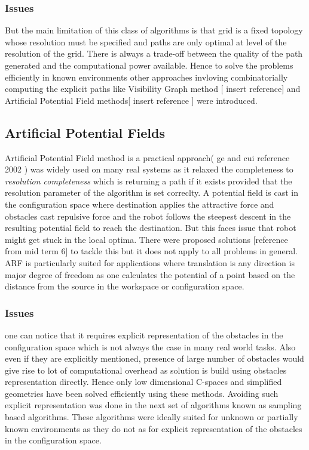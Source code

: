 \documentclass[MTech]{iitmdiss}
\begin{document}
\subsubsection{Issues}
 But the main limitation of this class of algorithms is that grid is a fixed topology whose resolution must be specified and paths are only optimal at level of  the resolution of the grid. There is always a trade-off between the quality of the path generated and the computational power available. Hence to solve the problems efficiently in known environments other approaches invloving combinatorially computing the explicit paths like Visibility Graph method [ insert reference]  and Artificial Potential Field methods[ insert reference ] were introduced. 
\subsection{Artificial Potential Fields}
Artificial Potential Field method is a practical approach( ge and cui reference 2002 ) was widely used on many real systems as it relaxed the completeness to \emph{resolution completeness} which is returning a path if it exists provided that the resolution parameter of the algorithm is set correclty. A potential field is cast in the configuration space where destination applies the attractive force and obstacles cast repulsive force and the robot follows the steepest descent in the resulting potential field to reach the destination. But this faces issue that robot might get stuck in the local optima. There were proposed solutions [reference from mid term 6] to tackle this but it does not apply to all problems in general. ARF is particularly suited for applications where translation is any direction is major degree of freedom as one calculates the potential of a point based on the distance from the source in the workspace or configuration space. 
\subsubsection{Issues}
 one can notice that it requires explicit representation of the obstacles in the configuration space which is not always the case in many real world tasks. Also even if they are explicitly mentioned, presence of large number of obstacles would give rise to lot of computational overhead as solution is build using obstacles representation directly. Hence only low dimensional C-spaces and simplified geometries have been solved efficiently using these methods. Avoiding such explicit representation was done in the next set of algorithms known as sampling based algorithms. These algorithms were ideally suited for unknown or partially known environments as they do not as for explicit representation of the obstacles in the configuration space.
\end{document}
